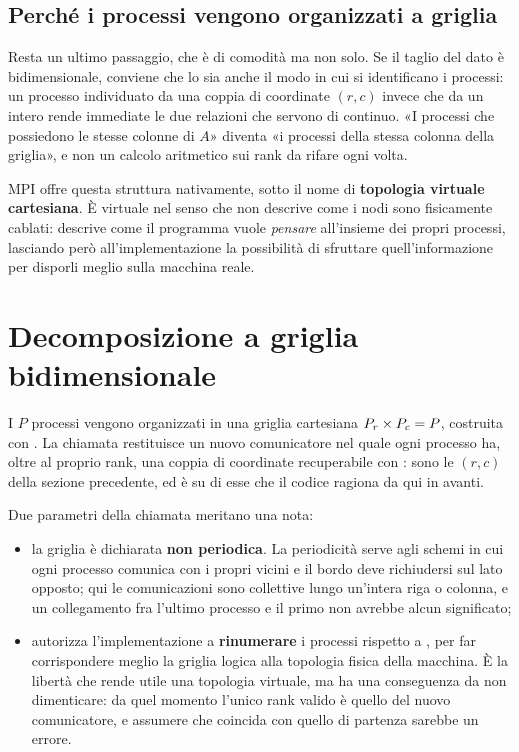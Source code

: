 \subsection{Perché i processi vengono organizzati a griglia}

Resta un ultimo passaggio, che è di comodità ma non solo. Se il taglio del
dato è bidimensionale, conviene che lo sia anche il modo in cui si identificano
i processi: un processo individuato da una coppia di coordinate
$(r, c)$ invece che da un intero rende immediate le due relazioni che servono
di continuo. «I processi che possiedono le stesse colonne di $A$» diventa «i
processi della stessa colonna della griglia», e non un calcolo aritmetico sui
rank da rifare ogni volta.

MPI offre questa struttura nativamente, sotto il nome di \textbf{topologia
virtuale cartesiana}. È virtuale nel senso che non descrive come i nodi sono
fisicamente cablati: descrive come il programma vuole \emph{pensare}
all'insieme dei propri processi, lasciando però all'implementazione la
possibilità di sfruttare quell'informazione per disporli meglio sulla macchina
reale.

\section{Decomposizione a griglia bidimensionale}
\label{sec:griglia}

I $P$ processi vengono organizzati in una griglia cartesiana
$P_r \times P_c = P$, costruita con . La chiamata
restituisce un nuovo comunicatore nel quale ogni processo ha, oltre al proprio
rank, una coppia di coordinate recuperabile con : sono
le $(r,c)$ della sezione precedente, ed è su di esse che il codice ragiona da
qui in avanti.

Due parametri della chiamata meritano una nota:

\begin{itemize}[nosep,left=0pt]
  \item la griglia è dichiarata \textbf{non periodica}. La periodicità serve
        agli schemi in cui ogni processo comunica con i propri vicini e il
        bordo deve richiudersi sul lato opposto; qui le comunicazioni sono
        collettive lungo un'intera riga o colonna, e un collegamento fra
        l'ultimo processo e il primo non avrebbe alcun significato;
  \item {} autorizza l'implementazione a \textbf{rinumerare}
        i processi rispetto a , per far corrispondere
        meglio la griglia logica alla topologia fisica della macchina. È la
        libertà che rende utile una topologia virtuale, ma ha una conseguenza
        da non dimenticare: da quel momento l'unico rank valido è quello del
        nuovo comunicatore, e assumere che coincida con quello di partenza
        sarebbe un errore.
\end{itemize}

